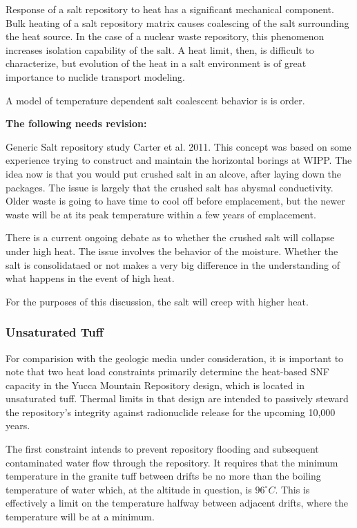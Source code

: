 Response of a salt repository to heat has a significant
mechanical component. Bulk heating of a salt repository matrix causes
coalescing  of the salt surrounding the heat source. In the case of a nuclear
waste repository, this phenomenon increases isolation capability of the salt. A
heat limit, then, is difficult to characterize, but evolution of the heat in a
salt environment is of great importance to nuclide transport modeling. 

A model of temperature dependent salt coalescent behavior is is order. 

\textbf{The following needs revision:}

Generic Salt repository study Carter et al. 2011. This concept was based on some 
experience trying to construct and maintain the horizontal borings at WIPP. The 
idea now is that you would put crushed salt in an alcove, after laying down the 
packages. The issue is largely that the crushed salt has abysmal conductivity. 
Older waste is going to have time to cool off before emplacement, but the newer 
waste will be at its peak temperature within a few years of emplacement.

There is a current ongoing debate as to whether the crushed salt will collapse 
under high heat. The issue involves the behavior of the moisture. Whether the salt 
is consolidataed or not makes a very big difference in the understanding of what 
happens in the event of high heat.


For the purposes of this discussion, the salt will creep with higher heat.



\subsubsection{Unsaturated Tuff}

For comparision with the geologic media under consideration, it is important to 
note that two heat load constraints primarily determine the heat-based SNF capacity
in the Yucca Mountain Repository design, which is located in unsaturated tuff.
Thermal limits in that design are intended to passively steward the
repository's integrity against radionuclide release for the upcoming 10,000
years.

The first constraint intends to prevent repository flooding and subsequent
contaminated water flow through the repository. It requires that the minimum
temperature in the granite tuff between drifts be no more than the boiling
temperature of water which, at the altitude in question, is $96^{\circ}C$. This
is effectively a limit on the temperature halfway between adjacent drifts,
where the temperature will be at a minimum.

